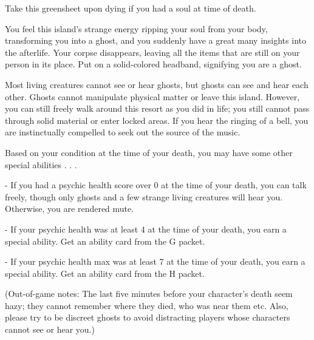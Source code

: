 \documentclass[green]{Kos}
\begin{document}
\name{\gGhost{}}

Take this greensheet upon dying if you had a soul at time of death.

You feel this island's strange energy ripping your soul from your body, transforming you into a ghost, and you suddenly have a great many insights into the afterlife. Your corpse disappears, leaving all the items that are still on your person in its place. Put on a solid-colored headband, signifying you are a ghost.

Most living creatures cannot see or hear ghosts, but ghosts can see and hear each other. Ghosts cannot manipulate physical matter or leave this island. However, you can still freely walk around this resort as you did in life; you still cannot pass through solid material or enter locked areas. If you hear the ringing of a bell, you are instinctually compelled to seek out the source of the music. 

Based on your condition at the time of your death, you may have some other special abilities . . . 

- If you had a psychic health score over 0 at the time of your death, you can talk freely, though only ghosts and a few strange living creatures will hear you. Otherwise, you are rendered mute.

- If your psychic health was at least 4 at the time of your death, you earn a special ability. Get an ability card from the G packet.

- If your psychic health max was at least 7 at the time of your death, you earn a special ability. Get an ability card from the H packet.


(Out-of-game notes: The last five minutes before your character's death seem hazy; they cannot remember where they died, who was near them etc.  Also, please try to be discreet ghosts to avoid distracting players whose characters cannot see or hear you.)
\end{document}
